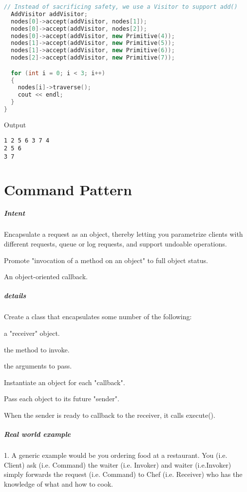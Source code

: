 \documentclass{book}
\begin{document}
\begin{lstlisting}[caption={example code},label={lst:rl},language=C++]
  // Instead of sacrificing safety, we use a Visitor to support add()
  AddVisitor addVisitor;
  nodes[0]->accept(addVisitor, nodes[1]);
  nodes[0]->accept(addVisitor, nodes[2]);
  nodes[0]->accept(addVisitor, new Primitive(4));
  nodes[1]->accept(addVisitor, new Primitive(5));
  nodes[1]->accept(addVisitor, new Primitive(6));
  nodes[2]->accept(addVisitor, new Primitive(7));

  for (int i = 0; i < 3; i++)
  {
    nodes[i]->traverse();
    cout << endl;
  }
}

\end{lstlisting}
Output
\begin{Verbatim}
1 2 5 6 3 7 4 
2 5 6 
3 7 
\end{Verbatim}
\chapter{Command Pattern}\label{CommandPattern}
\paragraph{Intent}
    Encapsulate a request as an object, thereby letting you parametrize clients with different requests, queue or log requests, and support undoable operations.

    Promote "invocation of a method on an object" to full object status.

    An object-oriented callback.
\paragraph{details}
    Create a class that encapsulates some number of the following:

        a "receiver" object. 

        the method to invoke.

        the arguments to pass.

    Instantiate an object for each "callback".

    Pass each object to its future "sender".

    When the sender is ready to callback to the receiver, it calls execute().
\paragraph{Real world example}\mbox{}
1. A generic example would be you ordering food at a restaurant. 
You (i.e. Client) ask (i.e. Command) the waiter (i.e. Invoker) %
and waiter (i.e.Invoker) simply forwards the request (i.e. Command) to Chef (i.e. Receiver) who has the knowledge of what and how to cook.
\end{document}
